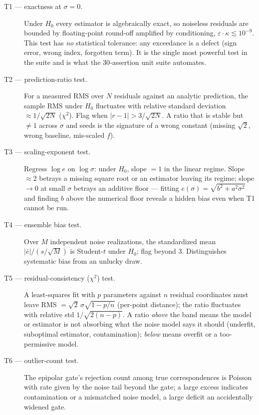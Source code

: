 \documentclass[11pt]{article}
\theoremstyle{definition}
\begin{document}
\begin{description}
  \item[T1 --- exactness at $\sigma=0$.] Under $H_0$ every estimator is
    algebraically exact, so noiseless residuals are bounded by
    floating-point round-off amplified by conditioning,
    $\varepsilon\cdot\kappa\lesssim10^{-9}$. This test has \emph{no}
    statistical tolerance: any exceedance is a defect (sign error, wrong
    index, forgotten term). It is the single most powerful test in the
    suite and is what the 30-assertion unit suite automates.
  \item[T2 --- prediction-ratio test.] For a measured RMS over $N$
    residuals against an analytic prediction, the sample RMS under $H_0$
    fluctuates with relative standard deviation $\approx1/\sqrt{2N}$
    ($\chi^2$). Flag when $|r-1|>3/\sqrt{2N}$. A ratio that is stable but
    $\neq1$ across $\sigma$ and seeds is the signature of a wrong constant
    (missing $\sqrt2$, wrong baseline, mis-scaled $f$).
  \item[T3 --- scaling-exponent test.] Regress $\log e$ on $\log\sigma$:
    under $H_0$, slope $=1$ in the linear regime. Slope $\approx2$
    betrays a missing square root or an estimator leaving its regime;
    slope $\to0$ at small $\sigma$ betrays an additive floor --- fitting
    $e(\sigma)=\sqrt{b^2+a^2\sigma^2}$ and finding $b$ above the
    numerical floor reveals a hidden bias even when T1 cannot be run.
  \item[T4 --- ensemble bias test.] Over $M$ independent noise
    realizations, the standardized mean $|\bar e|/(s/\sqrt M)$ is
    Student-$t$ under $H_0$; flag beyond $3$. Distinguishes systematic
    bias from an unlucky draw.
  \item[T5 --- residual-consistency ($\chi^2$) test.] A least-squares fit
    with $p$ parameters against $n$ residual coordinates must leave
    RMS $=\sqrt2\,\sigma\sqrt{1-p/n}$ (per-point distance); the ratio
    fluctuates with relative std $1/\sqrt{2(n-p)}$. A ratio
    \emph{above} the band means the model or estimator is not absorbing
    what the noise model says it should (underfit, suboptimal estimator,
    contamination); \emph{below} means overfit or a too-permissive
    model.
  \item[T6 --- outlier-count test.] The epipolar gate's rejection count
    among true correspondences is Poisson with rate given by the noise
    tail beyond the gate; a large excess indicates contamination or a
    mismatched noise model, a large deficit an accidentally widened gate.
\end{description}
\end{document}
